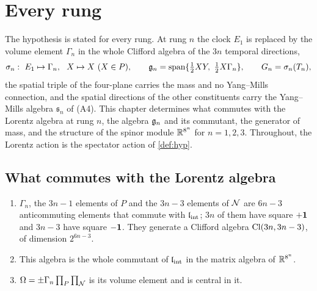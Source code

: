 \chapter{Every rung}
\label{ch:rungs}

The hypothesis is stated for every rung. At rung $n$ the clock $E_1$ is replaced by the volume element $\Gamma_n$ in the whole Clifford
algebra of the $3n$ temporal directions,
\[
\sigma_n:\ E_1\mapsto\Gamma_n,\ \ X\mapsto X\ (X\in P),\qquad \gn=\mathrm{span}\{\half XY,\ \half X\Gamma_n\},\qquad G_n=\sigma_n(T_n),
\]
the spatial triple of the four-plane carries the mass and no Yang--Mills connection, and the spatial directions of the other constituents
carry the Yang--Mills algebra $\mathfrak s_n$ of (A4). This chapter determines what commutes with the Lorentz algebra at rung $n$, the
algebra $\mathfrak g_n$ and its commutant, the generator of mass, and the structure of the spinor module $\mathbb{R}^{8^n}$ for $n=1,2,3$. Throughout, the
Lorentz action is the spectator action of \cref{def:hyp}.

\section{What commutes with the Lorentz algebra}

\begin{theorem}
\label{thm:commutant}
\begin{enumerate}[label=(\roman*),leftmargin=2.2em,itemsep=1pt]
\item $\Gamma_n$, the $3n-1$ elements of $P$ and the $3n-3$ elements of $\mathcal N$ are $6n-3$ anticommuting elements that commute with $\mathfrak l_{\rm int}$;
$3n$ of them have square $+\mathbf 1$ and $3n-3$ have square $-\mathbf 1$. They generate a Clifford algebra $\mathrm{Cl}(3n,3n-3)$, of dimension $2^{6n-3}$.
\item This algebra is the whole commutant of $\mathfrak l_{\rm int}$ in the matrix algebra of $\mathbb{R}^{8^n}$.
\item $\Omega=\pm\Gamma_n\prod_P\prod_{\mathcal N}$ is its volume element and is central in it.
\end{enumerate}
\end{theorem}


